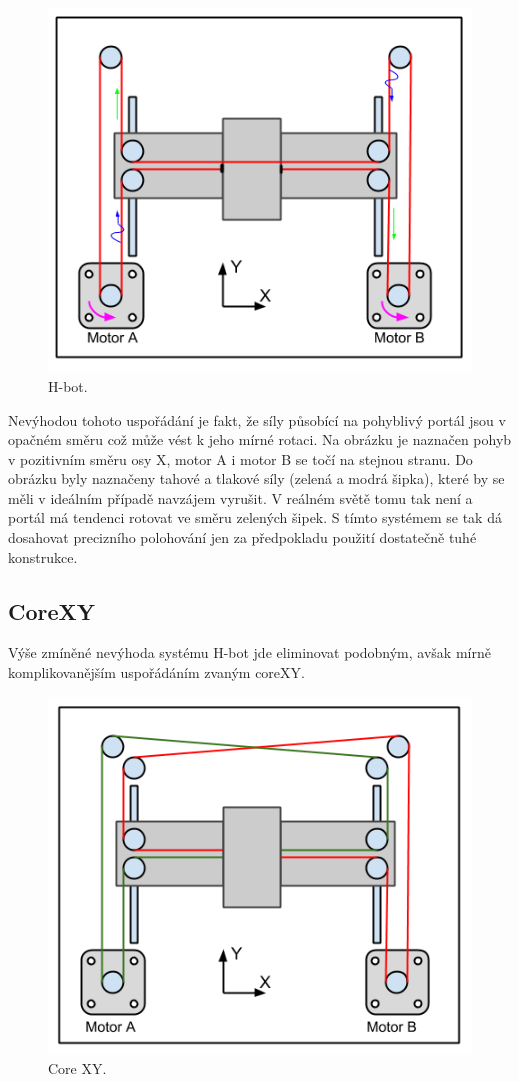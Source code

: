 \begin{figure}[h!]
  \centering
    \includegraphics[width=0.6\linewidth]{obrazky/Hbot.png}%
    \caption{H-bot.}
    \label{fig:Hbot}
\end{figure}

Nevýhodou tohoto uspořádání je fakt, že síly působící na pohyblivý portál jsou v opačném směru což může vést k jeho mírné rotaci. Na obrázku je naznačen pohyb v pozitivním směru osy X, motor A i motor B se točí na stejnou stranu. Do obrázku byly naznačeny tahové a tlakové síly (zelená a modrá šipka), které by se měli v ideálním případě navzájem vyrušit. V reálném světě tomu tak není a portál má tendenci rotovat ve směru zelených šipek.
 S tímto systémem se tak dá dosahovat precizního polohování jen za předpokladu použití dostatečně tuhé konstrukce.




\subsection{CoreXY}
Výše zmíněné nevýhoda systému H-bot jde eliminovat podobným, avšak mírně komplikovanějším uspořádáním zvaným coreXY. 

\begin{figure}[h!]
  \centering
    \includegraphics[width=0.6\linewidth]{obrazky/coreXY.png}%
    \caption{Core XY.}
    \label{fig:coreXY}
\end{figure}

